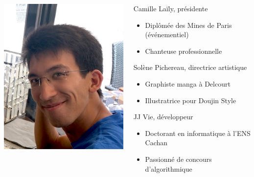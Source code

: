 \documentclass[handout]{beamer}
\begin{document}
\begin{frame}
\begin{columns}
\begin{column}{0.2\textwidth}
	\includegraphics[width=\linewidth]{figures/jj.jpg}
	\end{column}
	\begin{column}{0.8\textwidth}
	\begin{block}{Camille Laïly, présidente}
	\begin{itemize}
	\item Diplômée des Mines de Paris (événementiel)
	\item Chanteuse professionnelle
	\end{itemize}
	\end{block}
	\pause
	\begin{block}{Solène Pichereau, directrice artistique}
	\begin{itemize}
	\item Graphiste manga à Delcourt
	\item Illustratrice pour Doujin Style
	\end{itemize}
	\end{block}
	\pause
	\begin{block}{JJ Vie, développeur}
	\begin{itemize}
	\item Doctorant en informatique à l'ENS Cachan
	\item Passionné de concours d'algorithmique
	\end{itemize}
	\end{block}
	\end{column}
	\end{columns}
\end{frame}
\end{document}
